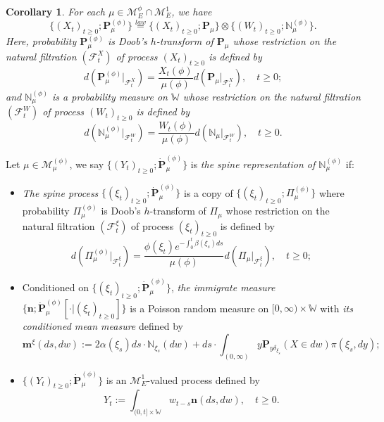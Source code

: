 \documentclass[12pt, a4paper]{amsart}
\newtheorem{cro}[thm]{Corollary}
\theoremstyle{definition}
\numberwithin{equation}{section}
\begin{document}
\begin{cro}
	For each $\mu \in \mathcal M_E^\phi \cap \mathcal M_E^1$, we have
\[
	\{(X_t)_{t\geq 0}; \mathbf P_\mu^{(\phi)}\}
	\overset{law}{=} \{(X_t)_{t\geq 0}; \mathbf P_\mu \} \otimes \{(W_t)_{t\geq 0}; \mathbb N^{(\phi)}_\mu\}.
\]
	Here, probability $\mathbf P_\mu^{(\phi)}$ is Doob's $h$-transform of $\mathbf P_\mu$ whose restriction on the natural filtration $(\mathscr F_t^X)$ of process $(X_t)_{t\geq 0}$ is defined by
\[
	d ( \mathbf P_\mu^{(\phi)}|_{\mathscr F_t^X}) = \frac{X_t(\phi)}{ \mu(\phi)} d(\mathbf P_\mu|_{\mathscr F_t^X}),
	\quad t\geq 0;
\]
	and $\mathbb N_\mu^{(\phi)}$ is a probability measure on $\mathbb W$ whose restriction on the natural filtration $(\mathscr F_t^W)$ of process $(W_t)_{t\geq 0}$ is defined by
\[
	d(\mathbb N_\mu^{(\phi)} |_{\mathscr F^W_t}  )
	= \frac{W_t(\phi)}{\mu(\phi)} d(\mathbb N_\mu |_{\mathscr F^W_t}  ),
	\quad t\geq 0.
\]
\end{cro}

	Let $\mu \in \mathcal M^{(\phi)}_\mu$, we say $\{(Y_t)_{ t\geq 0}; \dot {\mathbf P}^{(\phi)}_\mu\}$ is \emph{the spine representation of $\mathbb N^{(\phi)}_\mu$}  if:
\begin{itemize}
\item
	\emph{The spine process} $\{(\xi_t)_{t\geq 0}; \dot{\mathbf P}^{(\phi)}_\mu\}$ is a copy of $\{(\xi_t)_{t\geq 0}; \Pi^{(\phi)}_{\mu}\}$ where probability $\Pi_{\mu}^{(\phi)}$ is Doob's $h$-transform of $\Pi_\mu$ whose restriction on the natural filtration $(\mathscr F_t^\xi)$ of process $(\xi_t)_{t\geq 0}$ is defined by
\[
	d(\Pi_{\mu}^{(\phi)} |_{\mathscr F_t^\xi})
	= \frac{\phi(\xi_t)e^{-\int_0^t \beta(\xi_s)ds}}{\mu(\phi)} d(\Pi_{\mu} |_{\mathscr F_t^\xi}),
	\quad t\geq 0;
\]
\item
	Conditioned on $\{(\xi_t)_{t\geq 0}; \dot{\mathbf P}^{(\phi)}_\mu\}$, \emph{the immigrate measure} $\{\mathbf n; \dot{\mathbf P}^{(\phi)}_\mu[\cdot |(\xi_t)_{t\geq 0}]\}$ is a Poisson random measure on $[0,\infty ) \times \mathbb W$ with \emph{its conditioned mean measure} defined by
\[\label{eq:meanMeasImmigr}
	\mathbf m^\xi(ds,dw)
	:= 2 \alpha(\xi_s) ds \cdot \mathbb N_{\xi_s}(dw) + ds \cdot \int_{(0,\infty)} y \mathbf P_{y\delta_{\xi_s}}(X\in dw) \pi(\xi_s,dy);
\]
\item
	$\{(Y_t)_{t\geq 0}; \dot{\mathbf P}^{(\phi)}_\mu\}$ is an $\mathcal M^1_E$-valued process defined by
\[\label{eq:defSpinImmigr}
	Y_t
	:= \int_{(0,t] \times \mathbb W} w_{t-s} \mathbf n(ds,dw),
	\quad t\geq 0.
\]
\end{itemize}
\end{document}
